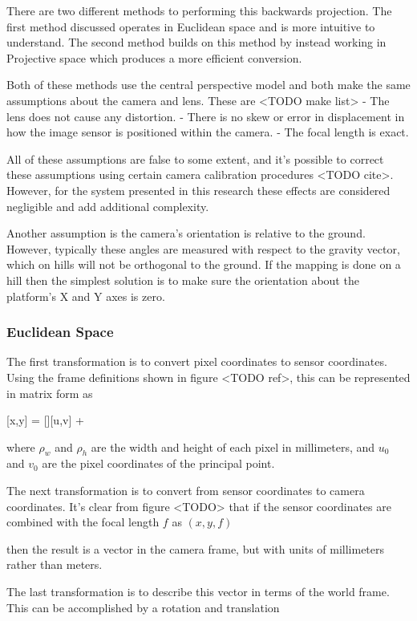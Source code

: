  There are two different methods to performing this backwards projection. The first method discussed operates in Euclidean space and is more intuitive to understand.  The second method builds on this method by instead working in Projective space which produces a more efficient conversion.
 
 Both of these methods use the central perspective model and both make the same assumptions about the camera and lens.  These are 
 <TODO make list>
   - The lens does not cause any distortion. 
   - There is no skew or error in displacement in how the image sensor is positioned within the camera.
   - The focal length is exact.
   
 All of these assumptions are false to some extent, and it's possible to correct these assumptions using certain camera calibration procedures <TODO cite>.  However, for the system presented in this research these effects are considered negligible and add additional complexity.
   
 Another assumption is the camera's orientation is relative to the ground.  However, typically these angles are measured with respect to the gravity vector, which on hills will not be orthogonal to the ground.  If the mapping is done on a hill then the simplest solution is to make sure the orientation about the platform's X and Y axes is zero.
 
 \subsubsection{Euclidean Space}
 
 The first transformation is to convert pixel coordinates to sensor coordinates.  Using the frame definitions shown in figure <TODO ref>, this can be represented in matrix form as 
 
 [x,y] = [][u,v] + 
 
 where $\rho_w$ and $\rho_h$ are the width and height of each pixel in millimeters, and $u_0$ and $v_0$ are the pixel coordinates of the principal point. 
 
 The next transformation is to convert from sensor coordinates to camera coordinates.  It's clear from figure <TODO> that if the sensor coordinates are combined with the focal length $f$ as
 $(x,y,f)$
 
 then the result is a vector in the camera frame, but with units of millimeters rather than meters. 
 
 The last transformation is to describe this vector in terms of the world frame.  This can be accomplished by a rotation and translation 
 
